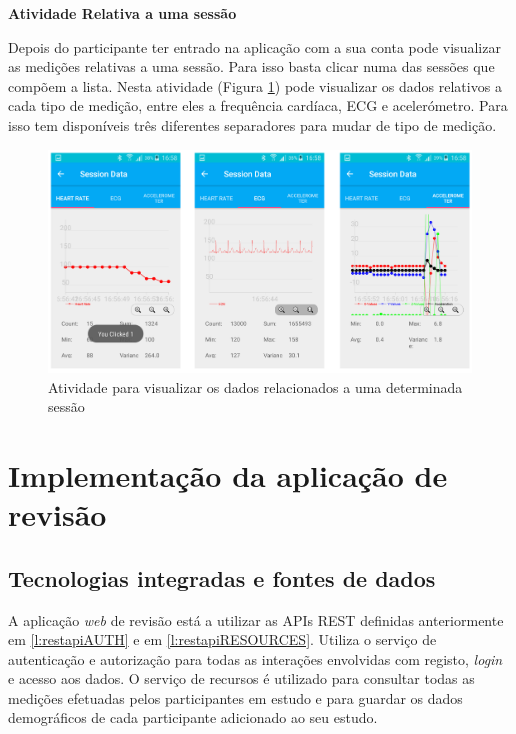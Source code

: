 \par
\textbf{Atividade Relativa a uma sessão}
\par
Depois do participante ter entrado na aplicação com a sua conta pode visualizar as medições relativas a uma sessão. Para isso basta clicar numa das sessões que compõem a lista. Nesta atividade (Figura \ref{f:read_data}) pode visualizar os dados relativos a cada tipo de medição, entre eles a frequência cardíaca, \gls{ECG} e acelerómetro. Para isso tem disponíveis três diferentes separadores para mudar de tipo de medição. 
\begin{figure}[H]
\centering
\includegraphics[height=0.4\textwidth]{imgs/read_data.png}
\caption[Atividade para visualizar os dados relacionados a uma determinada sessão]{Atividade para visualizar os dados relacionados a uma determinada sessão}
\label{f:read_data}
\end{figure}

\section{Implementação da aplicação de revisão}
\subsection{Tecnologias integradas e fontes de dados}

A aplicação \textit{web} de revisão está a utilizar as \gls{API}s \gls{REST} definidas anteriormente em \ref{l:restapiAUTH} e em \ref{l:restapiRESOURCES}. Utiliza o serviço de autenticação e autorização para todas as interações envolvidas com registo, \textit{login} e acesso aos dados. O serviço de recursos é utilizado para consultar todas as medições efetuadas pelos participantes em estudo e para guardar os dados demográficos de cada participante adicionado ao seu estudo.\par

